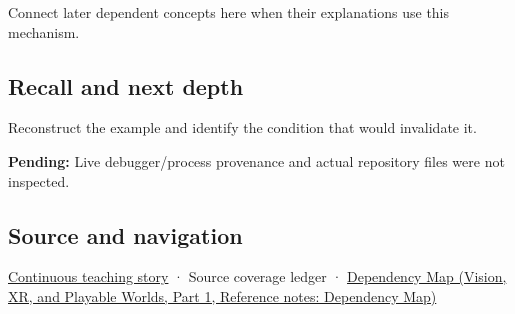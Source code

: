 \hypertarget{appendix-230b59c0676b-used-by}{}

Connect later dependent concepts here when their explanations use this mechanism.

\subsection{Recall and next depth}\label{appendix-230b59c0676b-recall-and-next-depth}

\hypertarget{appendix-230b59c0676b-recall-and-next-depth}{}

Reconstruct the example and identify the condition that would invalidate it.

\textbf{Pending:} Live debugger/process provenance and actual repository files were not inspected.

\subsection{Source and navigation}\label{appendix-230b59c0676b-source-and-navigation}

\hypertarget{appendix-230b59c0676b-source-and-navigation}{}

\hyperref[01-foundations-i-ch002-bytes-become-a-durable-agreement]{Continuous teaching story} · {Source coverage ledger} · \href{../07-Vision-XR-and-Playable-Worlds-P01/main.pdf\#nameddest=appendix-4ad47bdd269a}{Dependency Map (Vision, XR, and Playable Worlds, Part 1, Reference notes: Dependency Map)}
